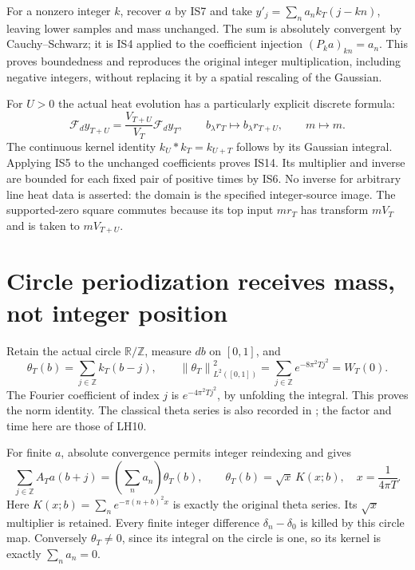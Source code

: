 \documentclass[11pt]{article}
\newcommand{\Z}{\mathbb Z}\newcommand{\C}{\mathbb C}\newcommand{\R}{\mathbb R}
\newcommand{\norm}[1]{\left\|#1\right\|}
\begin{document}
For a nonzero integer $k$, recover $a$ by IS7 and take
$y'_j=\sum_na_nk_T(j-kn)$, leaving lower samples and mass unchanged. The sum is absolutely convergent by Cauchy--Schwarz; it is IS4 applied to the coefficient injection $(P_ka)_{kn}=a_n$. This proves boundedness and reproduces the original integer multiplication, including negative integers, without replacing it by a spatial rescaling of the Gaussian.

For $U>0$ the actual heat evolution has a particularly explicit discrete formula:
\begin{equation}
\mathcal F_dy_{T+U}=\frac{V_{T+U}}{V_T}\mathcal F_dy_T,\qquad
b_\lambda r_T\longmapsto b_\lambda r_{T+U},\qquad m\longmapsto m. \tag{IS14}
\end{equation}
The continuous kernel identity $k_U*k_T=k_{U+T}$ follows by its Gaussian integral. Applying IS5 to the unchanged coefficients proves IS14. Its multiplier and inverse are bounded for each fixed pair of positive times by IS6. No inverse for arbitrary line heat data is asserted: the domain is the specified integer-source image. The supported-zero square commutes because its top input $mr_T$ has transform $mV_T$ and is taken to $mV_{T+U}$.

\section{Circle periodization receives mass, not integer position}
Retain the actual circle $\R/\Z$, measure $db$ on $[0,1]$, and
\begin{equation}
\theta_T(b)=\sum_{j\in\Z}k_T(b-j),\qquad
\norm{\theta_T}_{L^2([0,1])}^2=\sum_{j\in\Z}e^{-8\pi^2Tj^2}=W_T(0). \tag{IS15}
\end{equation}
The Fourier coefficient of index $j$ is $e^{-4\pi^2Tj^2}$, by unfolding the integral. This proves the norm identity. The classical theta series is also recorded in \cite[\S20.2]{DLMF}; the factor and time here are those of LH10.

For finite $a$, absolute convergence permits integer reindexing and gives
\begin{equation}
\sum_{j\in\Z}A_Ta(b+j)=\left(\sum_na_n\right)\theta_T(b),\qquad
\theta_T(b)=\sqrt{x}\,K(x;b),\quad x=\frac1{4\pi T}. \tag{IS16}
\end{equation}
Here $K(x;b)=\sum_ne^{-\pi(n+b)^2x}$ is exactly the original theta series. Its $\sqrt{x}$ multiplier is retained.
Every finite integer difference $\delta_n-\delta_0$ is killed by this circle map. Conversely $\theta_T\ne0$, since its integral on the circle is one, so its kernel is exactly $\sum_na_n=0$.
\end{document}
